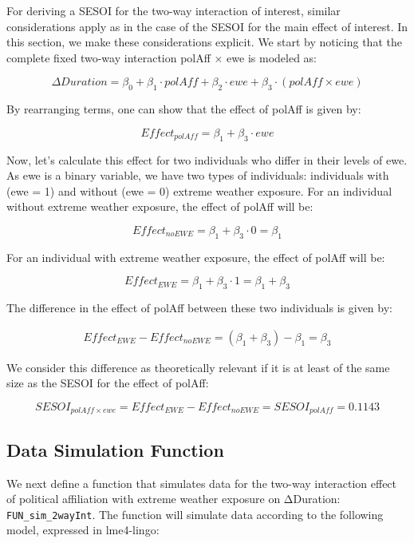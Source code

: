 \documentclass[
  letterpaper,
  DIV=11,
  numbers=noendperiod]{scrartcl}
\begin{document}
For deriving a SESOI for the two-way interaction of interest, similar
considerations apply as in the case of the SESOI for the main effect of
interest. In this section, we make these considerations explicit. We
start by noticing that the complete fixed two-way interaction polAff ×
ewe is modeled as:

\[
\Delta Duration = \beta_{0} + \beta_{1} \cdot polAff + \beta_{2} \cdot ewe  + \beta_{3} \cdot (polAff \times ewe)
\]

By rearranging terms, one can show that the effect of polAff is given
by:

\[
Effect_{polAff} = \beta_{1} + \beta_{3} \cdot ewe
\]

Now, let's calculate this effect for two individuals who differ in their
levels of ewe. As ewe is a binary variable, we have two types of
individuals: individuals with (ewe = 1) and without (ewe = 0) extreme
weather exposure. For an individual without extreme weather exposure,
the effect of polAff will be:

\[
Effect_{noEWE} = \beta_{1} + \beta_{3} \cdot 0 = \beta_{1}
\]

For an individual with extreme weather exposure, the effect of polAff
will be:

\[
Effect_{EWE} = \beta_{1} + \beta_{3} \cdot 1 = \beta_{1} + \beta_{3}
\]

The difference in the effect of polAff between these two individuals is
given by:

\[
\begin{split}
Effect_{EWE} - Effect_{noEWE} = (\beta_{1} + \beta_{3}) - \beta_{1} = \beta_{3}
\end{split}
\]

We consider this difference as theoretically relevant if it is at least
of the same size as the SESOI for the effect of polAff:

\[
SESOI_{polAff \times ewe} = Effect_{EWE} - Effect_{noEWE} = SESOI_{polAff} = 0.1143
\]

\subsection{Data Simulation Function}\label{data-simulation-function-1}

We next define a function that simulates data for the two-way
interaction effect of political affiliation with extreme weather
exposure on ΔDuration: \texttt{FUN\_sim\_2wayInt}. The function will
simulate data according to the following model, expressed in lme4-lingo:
\end{document}
